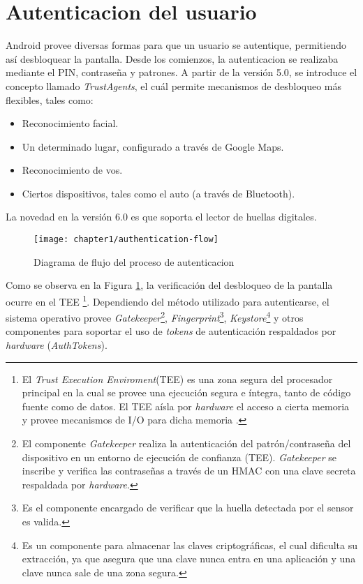 \section{Autenticacion del usuario}
Android provee diversas formas para que un usuario se autentique, permitiendo así desbloquear la pantalla. Desde los comienzos, la autenticacion se realizaba mediante el PIN, contraseña y patrones. A partir de la versión 5.0, se introduce el concepto llamado \textit{TrustAgents}, el cuál permite mecanismos de desbloqueo más flexibles, tales como:
\begin{itemize}
	\item Reconocimiento facial.
	\item Un determinado lugar, configurado a través de Google Maps.
	\item Reconocimiento de vos.
	\item Ciertos dispositivos, tales como el auto (a través de Bluetooth).
\end{itemize}
La novedad en la versión 6.0 es que soporta el lector de huellas digitales.\\
\begin{figure}[!ht]
	\begin{center}
		\texttt{[image: chapter1/authentication-flow]}
		\caption{Diagrama de flujo del proceso de autenticacion \cite{aossec}}
		\label{fig:ch01:authentication-flow}
	\end{center}
\end{figure}
Como se observa en la Figura \ref{fig:ch01:authentication-flow}, la verificación del desbloqueo de la pantalla ocurre en el TEE \footnote{El \textit{Trust Execution Enviroment}(TEE) es una zona segura del procesador principal en la cual se provee una ejecución segura e íntegra, tanto de código fuente como de datos. El TEE aísla por \textit{hardware} el acceso a cierta memoria y provee mecanismos de I/O para dicha memoria \cite{tee2011}.}.
Dependiendo del método utilizado para autenticarse, el sistema operativo provee \textit{Gatekeeper}\footnote{El componente \textit{Gatekeeper} realiza la autenticación del patrón/contraseña del dispositivo en un entorno de ejecución de confianza (TEE). \textit{Gatekeeper} se inscribe y verifica las contraseñas a través de un HMAC con una clave secreta respaldada por \textit{hardware}.}, \textit{Fingerprint}\footnote{Es el componente encargado de verificar que la huella detectada por el sensor es valida.}, \textit{Keystore}\footnote{Es un componente para almacenar las claves criptográficas, el cual dificulta su extracción, ya que asegura que una clave nunca entra en una aplicación y una clave nunca sale de una zona segura.\cite{dakss}} y otros componentes para soportar el uso de \textit{tokens} de autenticación respaldados por \textit{hardware} (\textit{AuthTokens}).\\

